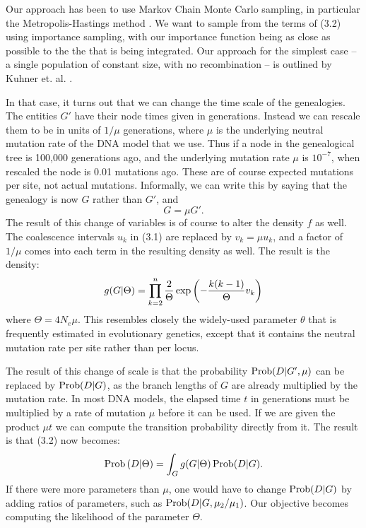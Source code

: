 Our approach has been to use Markov Chain Monte Carlo sampling, in particular
the Metropolis-Hastings method \cite{Metropolis53, Hastings70}.  We want to sample from
the terms of (3.2) using importance sampling, with our importance
function being as close as possible to the
the that is being integrated.  Our approach
for the simplest case -- a single population of constant size,
with no recombination -- is outlined by Kuhner et. al. \cite{Kuhner95,
Kuhner97}.

In that case, it turns out that we can change the time scale of the
genealogies.  The entities $G'$ have their node times given in generations.
Instead we can rescale them to be in units of $1/\mu$ generations, where
$\mu$ is the underlying neutral mutation rate of the DNA model that we
use.  Thus if a node in the genealogical tree is 100,000 generations
ago, and the underlying mutation rate $\mu$ is $10^{-7}$, when rescaled
the node is 0.01 mutations ago.  These are of course expected mutations
per site, not actual mutations.  Informally, we can write this by
saying that the genealogy is now $G$ rather than $G'$, and
\begin{equation} %
G = \mu G'.
\end{equation}
The result of this change of variables is of course to alter the
density $f$ as well.  The coalescence intervals $u_k$ in (3.1) are
replaced by $v_k = \mu u_k$, and a factor of $1/\mu$ comes into each
term in the resulting density as well.  The result is the density:
\begin{equation} %
g(G|\Theta) = \prod_{k=2}^{n} {2 \over \Theta}\exp\left(- {k(k-1) \over \Theta} v_k \right)
\end{equation}
where $\Theta = 4N_e \mu$.  This resembles closely the widely-used parameter
$\theta$ that is frequently estimated in evolutionary genetics, except that
it contains the neutral mutation rate per site rather than per locus.

The result of this change of scale is that the probability $\mathop{\rm Prob}\nolimits(D|G', \mu)$
can be replaced by $\mathop{\rm Prob}\nolimits(D|G)$, as the branch lengths of $G$ are already
multiplied by the mutation rate.  In most DNA models, the elapsed time $t$
in generations must be multiplied by a rate of mutation $\mu$ before it can be
used.  If we are given the product $\mu t$ we can compute the transition
probability directly from it.  The result is that (3.2) now becomes:
\begin{equation} %
\Prob\left(D|\Theta\right) = \int_G g(G|\Theta) \Prob(D|G).
\end{equation}
If there were more parameters than $\mu$, one would have to change
$\mathop{\rm Prob}\nolimits(D|G)$ by adding ratios of parameters, such as $\mathop{\rm Prob}\nolimits(D|G, \mu_2/\mu_1)$.
Our objective becomes computing the likelihood of the parameter $\Theta$.

